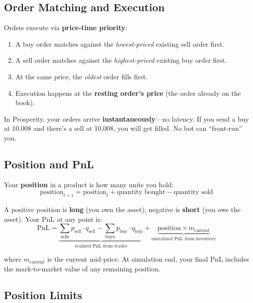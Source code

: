 \documentclass[11pt, letterpaper]{article}
\begin{document}
\subsection{Order Matching and Execution}

Orders execute via \textbf{price-time priority}:
\begin{enumerate}
    \item A buy order matches against the \emph{lowest-priced} existing sell order first.
    \item A sell order matches against the \emph{highest-priced} existing buy order first.
    \item At the same price, the \emph{oldest} order fills first.
    \item Execution happens at the \textbf{resting order's price} (the order already on the book).
\end{enumerate}

\begin{keyinsight}
In Prosperity, your orders arrive \textbf{instantaneously}---no latency. If you send a buy at 10{,}008 and there's a sell at 10{,}008, you will get filled. No bot can ``front-run'' you.
\end{keyinsight}

\subsection{Position and PnL}

Your \textbf{position} in a product is how many units you hold:
\begin{equation}
    \text{position}_{t+1} = \text{position}_t + \text{quantity bought} - \text{quantity sold}
\end{equation}

A positive position is \textbf{long} (you own the asset); negative is \textbf{short} (you owe the asset). Your PnL at any point is:
\begin{equation}
    \text{PnL} = \underbrace{\sum_{\text{sells}} p_{\text{sell}} \cdot q_{\text{sell}} - \sum_{\text{buys}} p_{\text{buy}} \cdot q_{\text{buy}}}_{\text{realized PnL from trades}} + \underbrace{\text{position} \times m_{\text{current}}}_{\text{unrealized PnL from inventory}}
\end{equation}

where $m_{\text{current}}$ is the current mid-price. At simulation end, your final PnL includes the mark-to-market value of any remaining position.

\subsection{Position Limits}\label{sec:pos-limits}
\end{document}
